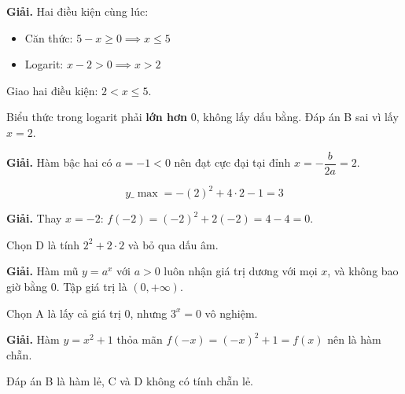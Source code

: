 \documentclass[11pt, a4paper]{article}
\begin{document}
\vspace{0.3cm}
\begin{dapan}[26 — Đáp án A]

\textbf{Giải.} Hai điều kiện cùng lúc:

\begin{itemize}[leftmargin=1.4em, itemsep=2pt]
\item Căn thức: $5 - x \ge 0 \implies x \le 5$
\item Logarit: $x - 2 > 0 \implies x > 2$
\end{itemize}

Giao hai điều kiện: $2 < x \le 5$.

 Biểu thức trong logarit phải \textbf{lớn hơn} 0, không lấy dấu bằng. Đáp án B sai vì lấy $x = 2$.


\end{dapan}
\vspace{0.3cm}
\begin{dapan}[27 — Đáp án C]

\textbf{Giải.} Hàm bậc hai có $a = -1 < 0$ nên đạt cực đại tại đỉnh $x = -\dfrac{b}{2a} = 2$.

$$y\_{\max} = -(2)^2 + 4 \cdot 2 - 1 = 3$$


\end{dapan}
\vspace{0.3cm}
\begin{dapan}[28 — Đáp án B]

\textbf{Giải.} Thay $x = -2$: $f(-2) = (-2)^2 + 2(-2) = 4 - 4 = 0$.

 Chọn D là tính $2^2 + 2 \cdot 2$ và bỏ qua dấu âm.


\end{dapan}
\vspace{0.3cm}
\begin{dapan}[29 — Đáp án D]

\textbf{Giải.} Hàm mũ $y = a^x$ với $a > 0$ luôn nhận giá trị dương với mọi $x$, và không bao giờ bằng 0. Tập giá trị là $(0, +\infty)$.

 Chọn A là lấy cả giá trị 0, nhưng $3^x = 0$ vô nghiệm.


\end{dapan}
\vspace{0.3cm}
\begin{dapan}[30 — Đáp án A]

\textbf{Giải.} Hàm $y = x^2 + 1$ thỏa mãn $f(-x) = (-x)^2 + 1 = f(x)$ nên là hàm chẵn.

Đáp án B là hàm lẻ, C và D không có tính chẵn lẻ.


\end{dapan}
\end{document}
